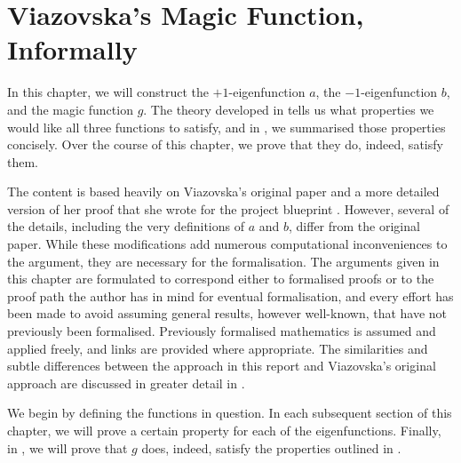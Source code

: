 \chapter{Viazovska's Magic Function, Informally}
\label{Ch4:Chapter}
\thispagestyle{empty}

In this chapter, we will construct the $+1$-eigenfunction $a$, the $-1$-eigenfunction $b$, and the magic function $g$. The theory developed in  tells us what properties we would like all three functions to satisfy, and in , we summarised those properties concisely. Over the course of this chapter, we prove that they do, indeed, satisfy them.

The content is based heavily on Viazovska's original paper \cite{Viazovska8} and a more detailed version of her proof that she wrote for the project blueprint \cite{blueprint}. However, several of the details, including the very definitions of $a$ and $b$, differ from the original paper. While these modifications add numerous computational inconveniences to the argument, they are necessary for the formalisation. The arguments given in this chapter are formulated to correspond either to formalised proofs or to the proof path the author has in mind for eventual formalisation, and every effort has been made to avoid assuming general results, however well-known, that have not previously been formalised. Previously formalised mathematics is assumed and applied freely, and links are provided where appropriate. The similarities and subtle differences between the approach in this report and Viazovska's original approach are discussed in greater detail in .

We begin by defining the functions in question. In each subsequent section of this chapter, we will prove a certain property for each of the eigenfunctions. Finally, in , we will prove that $g$ does, indeed, satisfy the properties outlined in .






